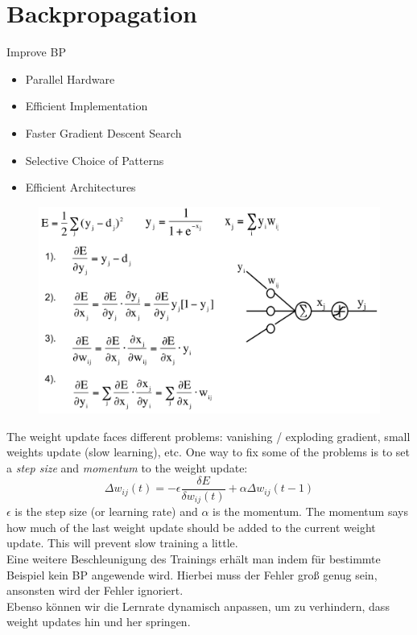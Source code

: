 \section{Backpropagation}
\label{sect:backpropagation}
Improve BP
\begin{itemize}
	\item Parallel Hardware
	\item Efficient Implementation
	\item Faster Gradient Descent Search
	\item Selective Choice of Patterns
	\item Efficient Architectures
\end{itemize}
\begin{figure}[h]
\includegraphics[scale=0.35]{bp}
\end{figure}
The weight update faces different problems: vanishing / exploding gradient, small weights update (slow learning), etc. One way to fix some of the problems is to set a \textit{step size} and \textit{momentum} to the weight update:
\[
\Delta w_{ij}(t) = - \epsilon \frac{\delta E}{\delta w_{ij}(t)} + \alpha \Delta w_{ij}(t - 1) 
\]
$\epsilon$ is the step size (or learning rate) and $\alpha$ is the momentum. The momentum says how much of the last weight update should be added to the current weight update. This will prevent slow training a little.\\[1cm]
Eine weitere Beschleunigung des Trainings erhält man indem für bestimmte Beispiel kein BP angewende wird. Hierbei muss der Fehler groß genug sein, ansonsten wird der Fehler ignoriert.\\[2cm]
Ebenso können wir die Lernrate dynamisch anpassen, um zu verhindern, dass weight updates hin und her springen.
